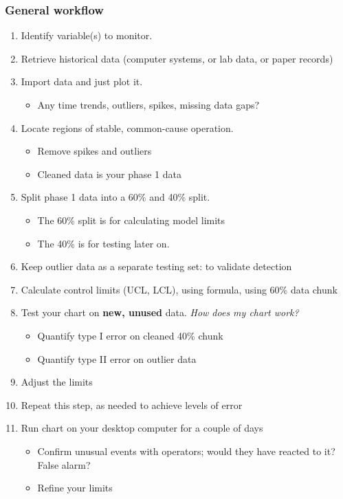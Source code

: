 \begin{frame}[allowframebreaks]\frametitle{General workflow}
	\begin{enumerate}
		\item	Identify variable(s) to monitor. 
		\item	Retrieve historical data (computer systems, or lab data, or paper records) 
		\item	Import data and just plot it. 
		\begin{itemize}
			\item	Any time trends, outliers, spikes, missing data gaps? 
		\end{itemize}
		\item	Locate regions of stable, common-cause operation. 
		\begin{itemize}
			\item	Remove spikes and outliers 
			\item	Cleaned data is your phase 1 data 
		\end{itemize}
		\item	Split phase 1 data into a 60\% and 40\% split. 
		\begin{itemize}
			\item	The 60\% split is for calculating model limits 
			\item	The 40\% is for testing later on. 
		\end{itemize}
		\item	Keep outlier data as a separate testing set: to validate detection 
		\item	Calculate control limits (UCL, LCL), using formula, using 60\% data chunk 
		\item	Test your chart on \textbf{new, unused} data. \emph{How does my chart work?} 
		\begin{itemize}
			\item	Quantify type I error on cleaned 40\% chunk 
			\item	Quantify type II error on outlier data 
		\end{itemize}
		\item	Adjust the limits 
		\item	Repeat this step, as needed to achieve levels of error 
		\item	Run chart on your desktop computer for a couple of days 
		\begin{itemize}
			\item	Confirm unusual events with operators; would they have reacted to it? False alarm? 
			\item	Refine your limits 

\end{itemize}
\end{enumerate}
\end{frame}
